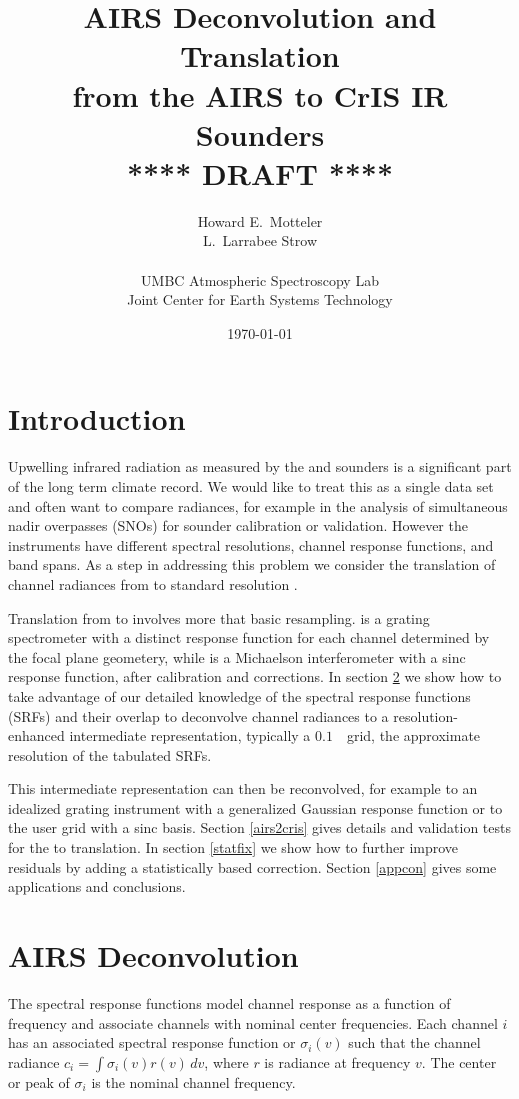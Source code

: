 \documentclass[11pt]{article}
\title{AIRS Deconvolution and Translation \\
  from the AIRS to CrIS IR Sounders \\
  \vspace{3mm}
  {****} DRAFT {****}\\
}
\author{Howard E.~Motteler \\
  L.~Larrabee Strow \\
  \\
  UMBC Atmospheric Spectroscopy Lab \\
  Joint Center for Earth Systems Technology \\
}
\date{\today}
\begin{document}
\maketitle

\section{Introduction}

Upwelling infrared radiation as measured by the {\airs} \cite{airs1}
and {\cris} \cite{cris1,cris2} sounders is a significant part of the
long term climate record.  We would like to treat this as a single
data set and often want to compare radiances, for example in the
analysis of simultaneous nadir overpasses (SNOs) for sounder
calibration or validation.  However the instruments have different
spectral resolutions, channel response functions, and band spans.
As a step in addressing this problem we consider the translation of
channel radiances from {\airs} to standard resolution {\cris}.

Translation from {\airs} to {\cris} involves more that basic
resampling.  {\airs} is a grating spectrometer with a distinct
response function for each channel determined by the focal plane
geometery, while {\cris} is a Michaelson interferometer with a sinc
response function, after calibration and corrections.  In section
\ref{decon} we show how to take advantage of our detailed knowledge
of the {\airs} spectral response functions (SRFs) and their overlap
to deconvolve channel radiances to a resolution-enhanced
intermediate representation, typically a $0.1$~\wn\ grid, the
approximate resolution of the tabulated {\airs} SRFs.  

This intermediate representation can then be reconvolved, for
example to an idealized grating instrument with a generalized
Gaussian response function or to the {\cris} user grid with a sinc
basis.  Section \ref{airs2cris} gives details and validation tests
for the {\airs} to {\cris} translation.  In section \ref{statfix} we
show how to further improve residuals by adding a statistically
based correction.  Section \ref{appcon} gives some applications and
conclusions.

\FloatBarrier
\section{AIRS Deconvolution}
\label{decon}

The {\airs} spectral response functions model channel response as a
function of frequency and associate channels with nominal center
frequencies.  Each {\airs} channel $i$ has an associated spectral
response function or {\srf} $\sigma_i(v)$ such that the channel
radiance $c_i = \int \sigma_i(v)r(v)\,dv$, where $r$ is radiance at
frequency $v$.  The center or peak of $\sigma_i$ is the nominal
channel frequency.
\end{document}
